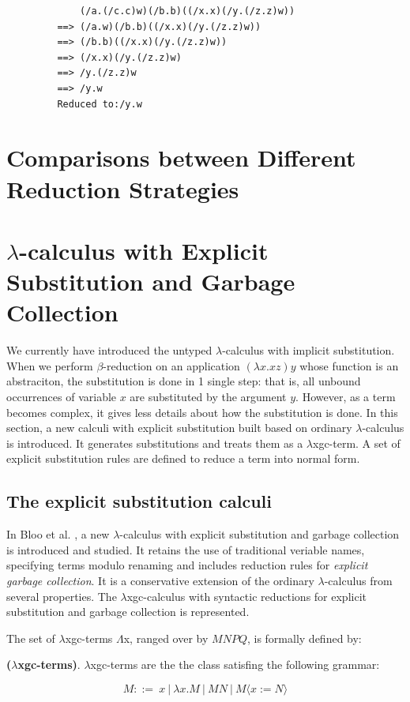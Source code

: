 \begin{verbatim}
             (/a.(/c.c)w)(/b.b)((/x.x)(/y.(/z.z)w))
         ==> (/a.w)(/b.b)((/x.x)(/y.(/z.z)w))
         ==> (/b.b)((/x.x)(/y.(/z.z)w))
         ==> (/x.x)(/y.(/z.z)w)
         ==> /y.(/z.z)w
         ==> /y.w
         Reduced to:/y.w
\end{verbatim}


\section{Comparisons between Different Reduction Strategies }



\section{$\lambda$-calculus with Explicit Substitution and Garbage Collection}

We currently have introduced the untyped $\lambda$-calculus with implicit substitution. When we perform $\beta$-reduction on an application $(\lambda x.xz)y$ whose function is an abstraciton, the substitution is done in 1 single step: that is, all unbound occurrences of variable $x$ are substituted by the argument $y$. However, as a term becomes complex, it gives less details about how the substitution is done. In this section, a new calculi with explicit substitution built based on ordinary $\lambda$-calculus is introduced. It generates substitutions and treats them as a $\lambda$xgc-term. A set of explicit substitution rules are defined to reduce a term into normal form.  

\subsection{The explicit substitution calculi}

In Bloo et al. \cite{bloo1995preservation}, a new $\lambda$-calculus with explicit substitution and garbage collection is introduced and studied. It retains the use of traditional veriable names, specifying terms modulo renaming and includes reduction rules for \textit{explicit garbage collection}. It is a conservative extension of the ordinary $\lambda$-calculus from several properties. The $\lambda$xgc-calculus with syntactic reductions for explicit substitution and garbage collection is represented.    

\noindent The set of $\lambda$xgc-terms $\Lambda$x, ranged over by $MNPQ$, is formally defined by: 
\begin{def1}
\normalfont \textbf{($\lambda$xgc-terms)}. $\lambda$xgc-terms are the the class satisfing the following grammar: 
\end{def1}
\begin{equation*}
M ::= \ x\ |\ \lambda x.M\ |\ MN\ |\ M\langle x:=N\rangle
\end{equation*}

